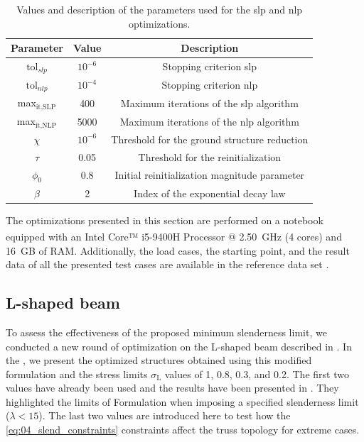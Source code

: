 \begin{table}
    \small
\centering
\begin{tabular}{ccc}
\toprule
\textbf{Parameter} & \textbf{Value} & \textbf{Description}    \\ \midrule
$\text{tol}_{slp}$             & $10^{-6}$           & Stopping criterion \gls{slp}                       \\
$\text{tol}_{nlp}$               & $10^{-4}$           & Stopping criterion \gls{nlp}                        \\
max$_{\text{it,SLP}}$        & 400            & Maximum iterations of the \gls{slp} algorithm                       \\
max$_{\text{it,NLP}}$         & 5000           & Maximum iterations of the \gls{nlp} algorithm                        \\
$\chi$                & $10^{-6}$           & Threshold for the ground structure reduction                        \\
$\tau$                & 0.05           & Threshold for the reinitialization                        \\
$\phi_0$              & 0.8            & Initial reinitialization magnitude parameter                         \\
$\beta$             & 2              & Index of the exponential decay law \\
\bottomrule
\end{tabular}
\caption{Values and description of the parameters used for the \gls{slp} and \gls{nlp} optimizations.}
\label{tab:04_param}
\end{table}

The optimizations presented in this section are performed on a notebook equipped with an Intel\textsuperscript{\textregistered} Core™ i5-9400H Processor @ \qty{2.50}{GHz} (4 cores) and \qty{16}{GB} of RAM. Additionally, the load cases, the starting point, and the result data of all the presented test cases are available in the reference data set .

\subsection{L-shaped beam}

To assess the effectiveness of the proposed minimum slenderness limit, we conducted a new round of optimization on the L-shaped beam described in . In the , we present the optimized structures obtained using this modified formulation and the stress limits $\sigma_\text{L}$ values of 1, 0.8, 0.3, and 0.2. The first two values have already been used and the results have been presented in . They highlighted the limits of Formulation  when imposing a specified slenderness limit ($\lambda<15$). The last two values are introduced here to test how the \ref{eq:04_slend_constraints} constraints affect the truss topology for extreme cases. 


